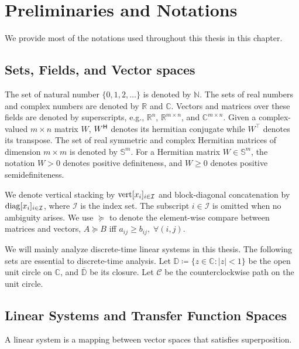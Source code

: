 \chapter{Preliminaries and Notations}
\label{chap:prelim}
We provide most of the notations used throughout this thesis in this chapter.

\section{Sets, Fields, and Vector spaces}
The set of natural number \(\{0,1,2,\hdots\}\) is denoted by \(\mathbb{N}\). The sets of real numbers and complex numbers are denoted by \(\mathbb{R}\) and \(\mathbb{C}\). Vectors and matrices over these fields are denoted by superscripts, e.g., $\mathbb{R}^{n}$, $\mathbb{R}^{m\times n}$, and $\mathbb{C}^{m\times n}$.
Given a complex-valued \(m\times n\) matrix \(W\), \(W^{\mathsf{H}}\) denotes its hermitian conjugate while \(W^\top\) denotes its transpose.
The set of real symmetric and complex Hermitian matrices of dimension $m\times m$ is denoted by $\mathbb{S}^{m}$. For a Hermitian matrix $W \in \mathbb{S}^{m}$, the notation $W > 0$ denotes positive definiteness, and $W \geq 0$ denotes positive semidefiniteness.

We denote vertical stacking by \({\mathrm{vert}}[x_i]_{i\in\mathcal{I}}\) and block-diagonal concatenation by \({\mathrm{diag}}[x_i]_{i\in\mathcal{I}}\), where \(\mathcal{I}\) is the index set. The subscript \(i\in\mathcal{I}\) is omitted when no ambiguity arises. 
We use \(\succeq\) to denote the element-wise compare between matrices and vectors, \(A \succeq B\) iff \(a_{ij} \geq b_{ij},\;\forall (i,j)\).

We will mainly analyze discrete-time linear systems in this thesis. The following sets are essential to discrete-time analysis. Let \(\mathbb{D}\coloneqq \{z\in\mathbb{C}:|z|<1\}\) be the open unit circle on \(\mathbb{C}\), and \(\bar{\mathbb{D}}\) be its closure. Let \(\mathcal{C}\) be the counterclockwise path on the unit circle.

\section{Linear Systems and Transfer Function Spaces}

A linear system is a mapping between vector spaces that satisfies superposition.

